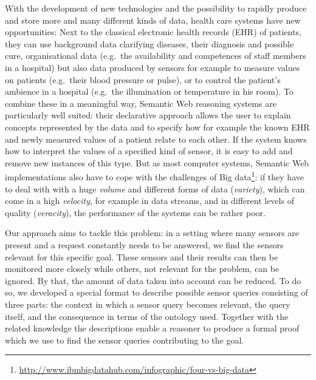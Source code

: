 With the development of new technologies 
and the possibility to rapidly produce and store more and many different kinds of data, health care
systems have new opportunities: Next to the classical electronic health records (EHR) of patients, they can
 use background data clarifying diseases, their diagnosis and possible cure, 
 organisational data (e.g.\ the availability and competences of staff members in a hospital)
but also
data produced by sensors for example to measure values on patients (e.g.\
their blood pressure or pulse), or to control the patient's ambience in a hospital (e.g.\ the illumination or temperature in his room).
To combine these in a meaningful way, Semantic Web reasoning systems are particularly well suited: their declarative approach allows the user to 
explain concepts represented by the data and to specify how for example the known EHR and newly measured values of a patient relate to each other.
If the system knows how to interpret the values of a specified kind of sensor, it is easy to add and remove new instances of this type. 
But as most computer systems, Semantic Web implementations also have to cope with the challenges of 
Big data\footnote{\url{http://www.ibmbigdatahub.com/infographic/four-vs-big-data}}: 
if they have to deal with with a huge \emph{volume}  and  different forms of data (\emph{variety}), which can come in a high \emph{velocity}, 
for example in data streams, and in different levels of quality (\emph{veracity}), the performance of the systems can be rather poor.



Our approach aims to tackle this problem: in a setting where many sensors are present and a request constantly needs to be answered, 
we find the sensors relevant for this specific goal. 
These sensors and their results can then be monitored more closely while others, not relevant for the problem, can be ignored. 
By that, the amount of data taken into account can be reduced.
To do so, we developed a special format to describe possible sensor queries consisting of three parts: the context in which a sensor query becomes relevant, 
the  query itself, and the consequence 
in terms of the ontology used. Together with the related knowledge the descriptions enable a reasoner to produce a formal proof which we %
use
to find the sensor queries contributing to the goal.

